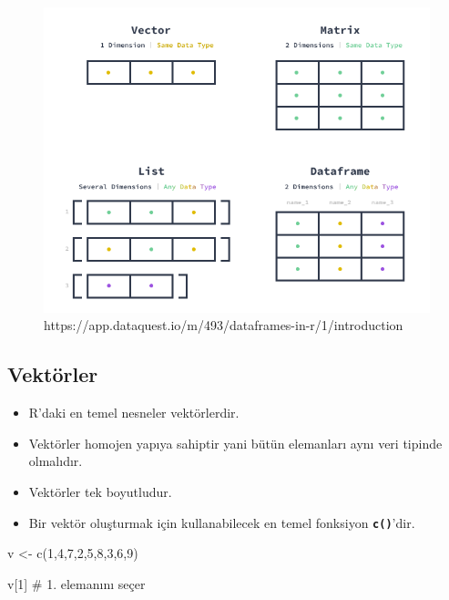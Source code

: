 \documentclass[
  letterpaper,
  DIV=11,
  numbers=noendperiod]{scrreprt}
\newenvironment{Shaded}{\begin{snugshade}}{\end{snugshade}}
\newcommand{\CommentTok}[1]{\textcolor[rgb]{0.37,0.37,0.37}{#1}}
\newcommand{\DecValTok}[1]{\textcolor[rgb]{0.68,0.00,0.00}{#1}}
\newcommand{\FunctionTok}[1]{\textcolor[rgb]{0.28,0.35,0.67}{#1}}
\newcommand{\NormalTok}[1]{\textcolor[rgb]{0.00,0.23,0.31}{#1}}
\newcommand{\OtherTok}[1]{\textcolor[rgb]{0.00,0.23,0.31}{#1}}
\begin{document}
\begin{figure}[H]

{\centering \includegraphics{images/data_structures.png}

}

\caption{https://app.dataquest.io/m/493/dataframes-in-r/1/introduction}

\end{figure}%

\subsection{Vektörler}\label{vektuxf6rler}

\begin{itemize}
\item
  R'daki en temel nesneler vektörlerdir.
\item
  Vektörler homojen yapıya sahiptir yani bütün elemanları aynı veri
  tipinde olmalıdır.
\item
  Vektörler tek boyutludur.
\item
  Bir vektör oluşturmak için kullanabilecek en temel fonksiyon
  \textbf{\texttt{c()}}'dir.
\end{itemize}

\begin{Shaded}
\begin{Highlighting}[]
\NormalTok{v }\OtherTok{\textless{}{-}} \FunctionTok{c}\NormalTok{(}\DecValTok{1}\NormalTok{,}\DecValTok{4}\NormalTok{,}\DecValTok{7}\NormalTok{,}\DecValTok{2}\NormalTok{,}\DecValTok{5}\NormalTok{,}\DecValTok{8}\NormalTok{,}\DecValTok{3}\NormalTok{,}\DecValTok{6}\NormalTok{,}\DecValTok{9}\NormalTok{)}

\NormalTok{v[}\DecValTok{1}\NormalTok{] }\CommentTok{\# 1. elemanını seçer}
\end{Highlighting}
\end{Shaded}
\end{document}
